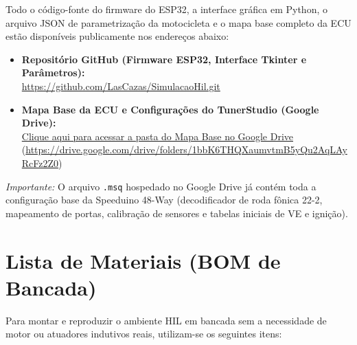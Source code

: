 \documentclass[12pt,a4paper]{article}
\begin{document}
\begin{tcolorbox}[colback=blue!4, colframe=blue!65!black, title=\textbf{Repositórios Oficiais para Reprodução (Código-Fonte e Mapa Base)}]
Todo o código-fonte do firmware do ESP32, a interface gráfica em Python, o arquivo JSON de parametrização da motocicleta e o mapa base completo da ECU estão disponíveis publicamente nos endereços abaixo:
\begin{itemize}[leftmargin=1.2em, itemsep=4pt]
    \item \textbf{Repositório GitHub (Firmware ESP32, Interface Tkinter e Parâmetros):} \\
    \url{https://github.com/LasCazas/SimulacaoHil.git}
    \item \textbf{Mapa Base da ECU e Configurações do TunerStudio (Google Drive):} \\
    \href{https://drive.google.com/drive/folders/1bbK6THQXaumvtmB5yQu2AqLAyRcFz2Z0}{Clique aqui para acessar a pasta do Mapa Base no Google Drive} \\
    {\footnotesize (\url{https://drive.google.com/drive/folders/1bbK6THQXaumvtmB5yQu2AqLAyRcFz2Z0})}
\end{itemize}
\vspace{2pt}
\footnotesize\textit{Importante:} O arquivo \texttt{.msq} hospedado no Google Drive já contém toda a configuração base da Speeduino 48-Way (decodificador de roda fônica 22-2, mapeamento de portas, calibração de sensores e tabelas iniciais de VE e ignição).
\end{tcolorbox}

\section{Lista de Materiais (BOM de Bancada)}

Para montar e reproduzir o ambiente HIL em bancada sem a necessidade de motor ou atuadores indutivos reais, utilizam-se os seguintes itens:
\end{document}
